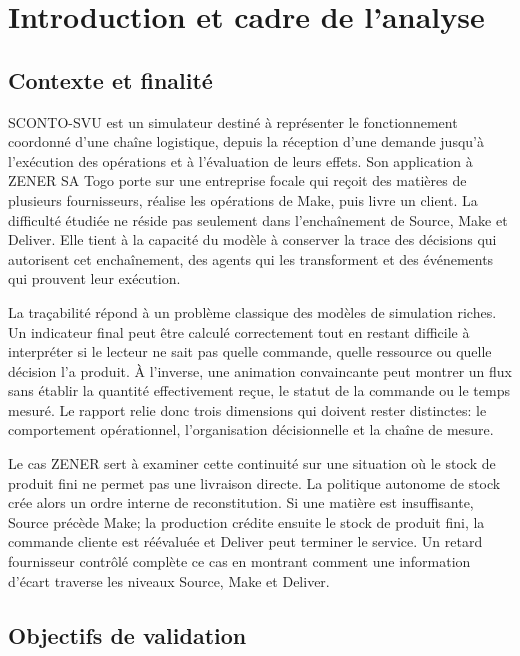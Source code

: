 \chapter{Introduction et cadre de l'analyse}
\label{chap:introduction}

\section{Contexte et finalité}

SCONTO-SVU est un simulateur destiné à représenter le fonctionnement coordonné d'une chaîne logistique, depuis la réception d'une demande jusqu'à l'exécution des opérations et à l'évaluation de leurs effets. Son application à ZENER SA Togo porte sur une entreprise focale qui reçoit des matières de plusieurs fournisseurs, réalise les opérations de Make, puis livre un client. La difficulté étudiée ne réside pas seulement dans l'enchaînement de Source, Make et Deliver. Elle tient à la capacité du modèle à conserver la trace des décisions qui autorisent cet enchaînement, des agents qui les transforment et des événements qui prouvent leur exécution.

La traçabilité répond à un problème classique des modèles de simulation riches. Un indicateur final peut être calculé correctement tout en restant difficile à interpréter si le lecteur ne sait pas quelle commande, quelle ressource ou quelle décision l'a produit. À l'inverse, une animation convaincante peut montrer un flux sans établir la quantité effectivement reçue, le statut de la commande ou le temps mesuré. Le rapport relie donc trois dimensions qui doivent rester distinctes: le comportement opérationnel, l'organisation décisionnelle et la chaîne de mesure.

Le cas ZENER sert à examiner cette continuité sur une situation où le stock de produit fini ne permet pas une livraison directe. La politique autonome de stock crée alors un ordre interne de reconstitution. Si une matière est insuffisante, Source précède Make; la production crédite ensuite le stock de produit fini, la commande cliente est réévaluée et Deliver peut terminer le service. Un retard fournisseur contrôlé complète ce cas en montrant comment une information d'écart traverse les niveaux Source, Make et Deliver.

\section{Objectifs de validation}

